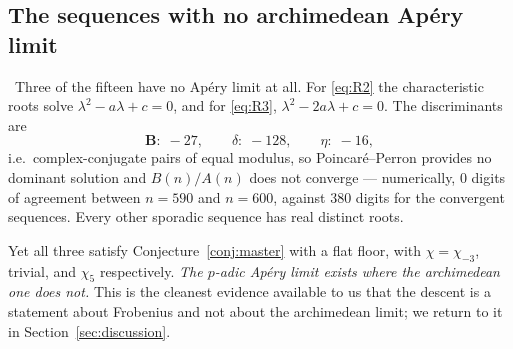 \subsection{The sequences with no archimedean Ap\'ery limit}
\label{ssec:nolimit}

\begin{observation}\label{obs:nolimit}
\Verified\ Three of the fifteen have no Ap\'ery limit at all. For \eqref{eq:R2} the
characteristic roots solve $\lambda^2-a\lambda+c=0$, and for \eqref{eq:R3},
$\lambda^2-2a\lambda+c=0$. The discriminants are
\[
   \mathbf B:\;-27,\qquad \delta:\;-128,\qquad \eta:\;-16,
\]
i.e.\ complex-conjugate pairs of equal modulus, so Poincar\'e--Perron provides no dominant
solution and $B(n)/A(n)$ does not converge --- numerically, $0$ digits of agreement
between $n=590$ and $n=600$, against $380$ digits for the convergent sequences. Every
other sporadic sequence has real distinct roots.
\end{observation}

Yet all three satisfy Conjecture~\ref{conj:master} with a flat floor, with
$\chi=\chi_{-3}$, trivial, and $\chi_5$ respectively. \emph{The $p$-adic Ap\'ery limit
exists where the archimedean one does not.} This is the cleanest evidence available to us
that the descent is a statement about Frobenius and not about the archimedean limit; we
return to it in Section~\ref{sec:discussion}.
